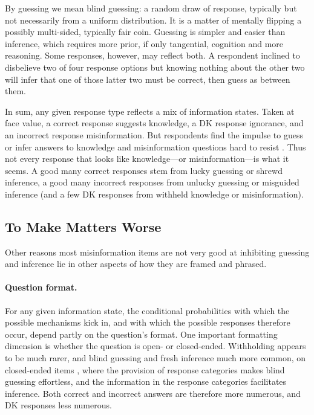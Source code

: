 \documentclass[11pt]{article}
\begin{document}
By guessing we mean blind guessing: a random draw of response, typically but not necessarily from a uniform distribution. It is a matter of mentally flipping a possibly multi-sided, typically fair coin. Guessing is simpler and easier than inference, which requires more prior, if only tangential, cognition and more reasoning. Some responses, however, may reflect both. A respondent inclined to disbelieve two of four response options but knowing nothing about the other two will infer that one of those latter two must be correct, then guess as between them.

In sum, any given response type reflects a mix of information states. Taken at face value, a correct response suggests knowledge, a DK response ignorance, and an incorrect response misinformation. But respondents find the impulse to guess or infer answers to knowledge and misinformation questions hard to resist \citep{cor2016}. Thus not every response that looks like knowledge---or misinformation---is what it seems. A good many correct responses stem from lucky guessing or shrewd inference, a good many incorrect responses from unlucky guessing or misguided inference (and a few DK responses from withheld knowledge or misinformation).

\subsection{To Make Matters Worse}

Other reasons most misinformation items are not very good at inhibiting guessing and inference lie in other aspects of how they are framed and phrased.

\paragraph{Question format.} For any given information state, the conditional probabilities with which the possible mechanisms kick in, and with which the possible responses therefore occur, depend partly on the question's format. One important formatting dimension is whether the question is open- or closed-ended. Withholding appears to be much rarer, and blind guessing and fresh inference much more common, on closed-ended items \citep{luskin2005, luskin2011, luskin2012}, where the provision of response categories makes blind guessing effortless, and the information in the response categories facilitates inference. Both correct and incorrect answers are therefore more numerous, and DK responses less numerous.
\end{document}
